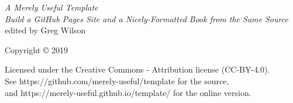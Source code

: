 \documentclass[10pt,letterpaper]{memoir}
\begin{document}
\pagestyle{empty}

{\begingroup
  \raggedleft
  \vspace*{\baselineskip}

  {\Huge\itshape A Merely Useful Template}\\[\baselineskip]

  {\large\itshape
    Build a GitHub Pages Site and a Nicely-Formatted Book from the Same Source
  }\\[0.2\textheight]

  {\large edited by Greg Wilson}\par

  \vfill

  {\large Copyright {\copyright} 2019}

  \vspace*{\baselineskip}


  \vspace*{\baselineskip}

  {\small
    Licensed under the Creative Commons - Attribution license (CC-BY-4.0).
    \\
    See https://github.com/merely-useful/template for the source,\\
    and https://merely-useful.github.io/template/ for the online version.
  }

\endgroup}

\newpage

\pagestyle{empty}

~

\newpage

\tableofcontents

\newpage

\pagestyle{empty}

~

\newpage

\pagestyle{plain}


\end{document}
